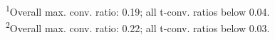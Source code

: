 \vspace{-5mm}
\begin{minipage}{\linewidth}
\textsuperscript{1}Overall max. conv. ratio: 0.19; all t-conv. ratios below 0.04. \\ 
\textsuperscript{2}Overall max. conv. ratio: 0.22; all t-conv. ratios below 0.03. \\ 
\end{minipage}
